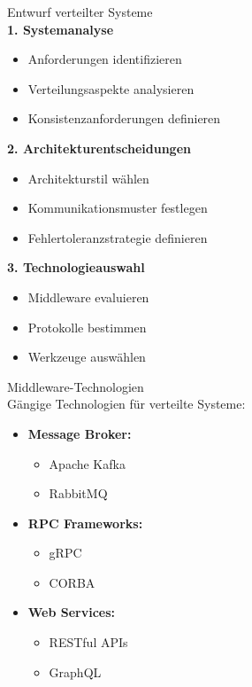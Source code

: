 \begin{KR}{Entwurf verteilter Systeme}\\
\textbf{1. Systemanalyse}
\begin{itemize}
    \item Anforderungen identifizieren
    \item Verteilungsaspekte analysieren
    \item Konsistenzanforderungen definieren
\end{itemize}

\textbf{2. Architekturentscheidungen}
\begin{itemize}
    \item Architekturstil wählen
    \item Kommunikationsmuster festlegen
    \item Fehlertoleranzstrategie definieren
\end{itemize}

\textbf{3. Technologieauswahl}
\begin{itemize}
    \item Middleware evaluieren
    \item Protokolle bestimmen
    \item Werkzeuge auswählen
\end{itemize}
\end{KR}

\begin{concept}{Middleware-Technologien}\\
Gängige Technologien für verteilte Systeme:
\begin{itemize}
    \item \textbf{Message Broker:} 
    \begin{itemize}
        \item Apache Kafka
        \item RabbitMQ
    \end{itemize}
    \item \textbf{RPC Frameworks:}
    \begin{itemize}
        \item gRPC
        \item CORBA
    \end{itemize}
    \item \textbf{Web Services:}
    \begin{itemize}
        \item RESTful APIs
        \item GraphQL
    \end{itemize}
\end{itemize}
\end{concept}



